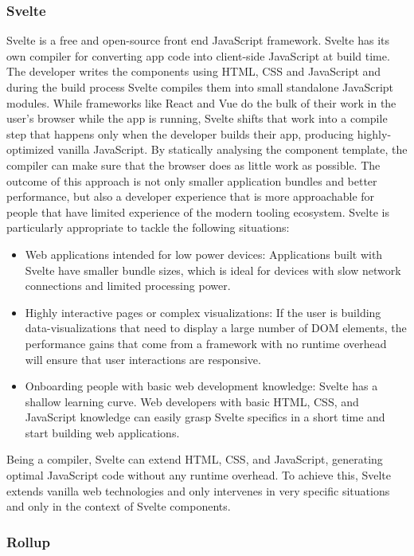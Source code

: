 \documentclass[english,engineering]{wizthesis}
\newcommand{\paraphrase}[1]{#1}
\begin{document}
\subsubsection*{Svelte}

Svelte \cite{svelte} is a free and open-source front end JavaScript framework.
Svelte has its own compiler for converting app code into client-side JavaScript
at build time. \paraphrase{The developer writes the components using HTML, CSS
and JavaScript and during the build process Svelte compiles them into small
standalone JavaScript modules. While frameworks like React and Vue do the bulk
of their work in the user's browser while the app is running, Svelte shifts that
work into a compile step that happens only when the developer builds their app,
producing highly-optimized vanilla JavaScript. By statically analysing the
component template, the compiler can make sure that the browser does as little
work as possible. The outcome of this approach is not only smaller application
bundles and better performance, but also a developer experience that is more
approachable for people that have limited experience of the modern tooling
ecosystem. Svelte is particularly appropriate to tackle the following
situations:
\begin{itemize}
  \item Web applications intended for low power devices: Applications built with
  Svelte have smaller bundle sizes, which is ideal for devices with slow network
  connections and limited processing power.
  \item Highly interactive pages or complex visualizations: If the user is
  building data-visualizations that need to display a large number of DOM
  elements, the performance gains that come from a framework with no runtime
  overhead will ensure that user interactions are responsive.
  \item Onboarding people with basic web development knowledge: Svelte has a
  shallow learning curve. Web developers with basic HTML, CSS, and JavaScript
  knowledge can easily grasp Svelte specifics in a short time and start building
  web applications.
\end{itemize}

Being a compiler, Svelte can extend HTML, CSS, and JavaScript, generating
optimal JavaScript code without any runtime overhead. To achieve this, Svelte
extends vanilla web technologies and only intervenes in very specific situations
and only in the context of Svelte components.}

\subsubsection*{Rollup}
\end{document}

